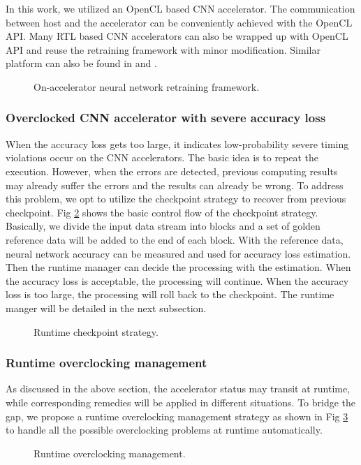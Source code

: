 In this work, we utilized an OpenCL based CNN accelerator. The communication between 
host and the accelerator can be conveniently achieved with the OpenCL API. 
Many RTL based CNN accelerators can also be wrapped up with 
OpenCL API and reuse the retraining framework with minor modification.
Similar platform can also be found in \cite{Caffeine_6} and \cite{DiCecco_4}.


\begin{figure}
    \caption{On-accelerator neural network retraining framework.}
\label{fig:retrain}
\vspace{-1em}
\end{figure}

\subsubsection{Overclocked CNN accelerator with severe accuracy loss}
When the accuracy loss gets too large, it indicates low-probability severe timing 
violations occur on the CNN accelerators. The basic idea is to repeat the execution. 
However, when the errors are detected, previous computing results may already suffer 
the errors and the results can already be wrong. To address this problem, we opt to 
utilize the checkpoint strategy to recover from previous checkpoint. 
Fig \ref{fig:loss_checkpoint} shows the basic control flow of the checkpoint strategy.
Basically, we divide the input data stream into blocks and a set of golden reference data 
will be added to the end of each block. With the reference data, neural network accuracy 
can be measured and used for accuracy loss estimation. Then the runtime manager 
can decide the processing with the estimation. When the accuracy loss is acceptable, 
the processing will continue. When the accuracy loss is too large, the processing 
will roll back to the checkpoint. The runtime manger will be detailed 
in the next subsection. 

\begin{figure}
    \caption{Runtime checkpoint strategy.}
\label{fig:loss_checkpoint}
\vspace{-1em}
\end{figure}


\subsubsection{Runtime overclocking management}
As discussed in the above section, the accelerator status may transit at runtime, 
while corresponding remedies will be applied in different situations. To bridge the 
gap, we propose a runtime overclocking management strategy as shown in 
Fig \ref{fig:runtime-management} to handle all the possible overclocking problems 
at runtime automatically.
\begin{figure}
    \caption{Runtime overclocking management.}
\label{fig:runtime-management}
\vspace{-1em}
\end{figure}


